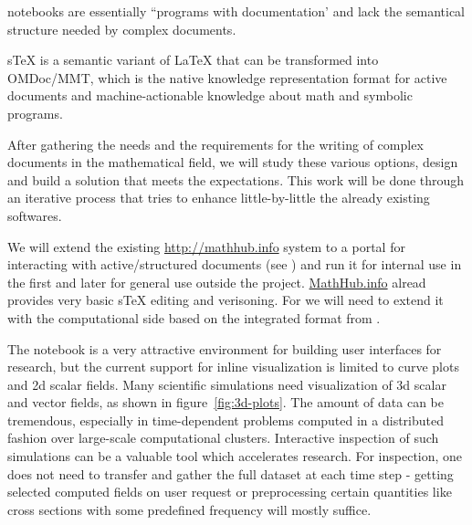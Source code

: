 \begin{workpackage}
\begin{tasklist}
\begin{task}[title=Structured documents,id=structdocs,lead=JU,PM=24,lead=JU,partners={SR,USH}]
\begin{compactitem}
  \item  \Jupyter notebooks are essentially ``programs with
    documentation' and lack the semantical structure needed by complex
    documents.

  \item  sTeX is a semantic variant of LaTeX that can be transformed into
    OMDoc/MMT, which is the native knowledge representation format for
    active documents and machine-actionable knowledge about math and
    symbolic programs.

  \end{compactitem}

  After gathering the needs and the requirements for the writing of complex
  documents in the mathematical field, we will study these various options,
  design and build a solution that meets the expectations. This work will be
  done through an iterative process that tries to enhance little-by-little the
  already existing softwares.

\end{task}

\begin{task}[id=mathhub,title=Active Documents Portal,lead=JU,PM=12]
  We will extend the existing \url{http://mathhub.info} system to a portal for
  interacting with active/structured documents (see ) and run it
  for internal use in the \TheProject first and later for general use outside the
  project. \url{MathHub.info} alread provides very basic sTeX editing and verisoning. For
  \TheProject we will need to extend it with the computational side based on the
  integrated format from .
\end{task}



\begin{task}[title=Visualization system for 3d data in web-notebook
,id=vis3d,lead=SR, partners={US,PS,USO}]

The \Jupyter notebook is a very attractive environment for building
user interfaces for research, but the current support for inline
visualization is limited to curve plots and 2d scalar fields. Many
scientific simulations need visualization of 3d scalar and vector
fields, as shown in figure~\ref{fig:3d-plots}. 
The amount of data can be tremendous, especially in
time-dependent problems computed in a distributed fashion over
large-scale computational clusters. Interactive inspection of such
simulations can be a valuable tool which accelerates research. For
inspection, one does not need to transfer and gather the full dataset
at each time step - getting selected computed fields on user request
or preprocessing certain quantities like cross sections with some
predefined frequency will mostly suffice.


\end{task}
\end{tasklist}
\end{workpackage}
